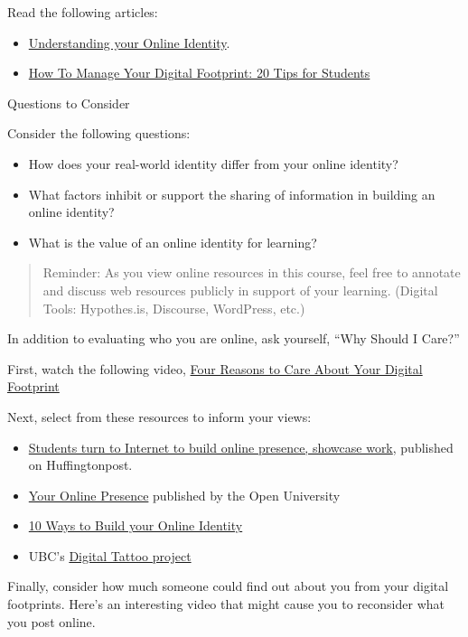 \documentclass[
]{book}
\providecommand{\tightlist}{%
  \setlength{\itemsep}{0pt}\setlength{\parskip}{0pt}}
\theoremstyle{definition}
\theoremstyle{definition}
\theoremstyle{definition}
\theoremstyle{definition}
\theoremstyle{remark}
\begin{document}
\begin{reflect}
Read the following articles:

\begin{itemize}
\tightlist
\item
  \href{assets/u4/U4_Understanding-your-Online-Identity-An-Overview-of-Identity.pdf}{Understanding your Online Identity}.
\item
  \href{https://research.com/education/how-to-manage-digital-footprint}{How To Manage Your Digital Footprint: 20 Tips for Students}
\end{itemize}

{Questions to Consider}

Consider the following questions:

\begin{itemize}
\tightlist
\item
  How does your real-world identity differ from your online identity?\\
\item
  What factors inhibit or support the sharing of information in building an online identity?\\
\item
  What is the value of an online identity for learning?
\end{itemize}

\begin{quote}
Reminder: As you view online resources in this course, feel free to annotate and discuss web resources publicly in support of your learning. (Digital Tools: Hypothes.is, Discourse, WordPress, etc.)
\end{quote}

In addition to evaluating who you are online, ask yourself, ``Why Should I Care?''

First, watch the following video, \href{https://www.youtube.com/watch?v=Ro_LlRg8rGg}{Four Reasons to Care About Your Digital Footprint}

Next, select from these resources to inform your views:

\begin{itemize}
\tightlist
\item
  \href{https://www.huffpost.com/entry/students-turn-to-internet_b_3518598}{Students turn to Internet to build online presence, showcase work}, published on Huffingtonpost.
\item
  \href{https://help.open.ac.uk/your-online-presence}{Your Online Presence} published by the Open University
\item
  \href{https://www.careercast.com/career-news/10-ways-build-your-online-identity}{10 Ways to Build your Online Identity}
\item
  UBC's \href{https://digitaltattoo.ubc.ca/}{Digital Tattoo project}
\end{itemize}

Finally, consider how much someone could find out about you from your digital footprints. Here's an interesting video that might cause you to reconsider what you post online.
\end{reflect}
\end{document}
